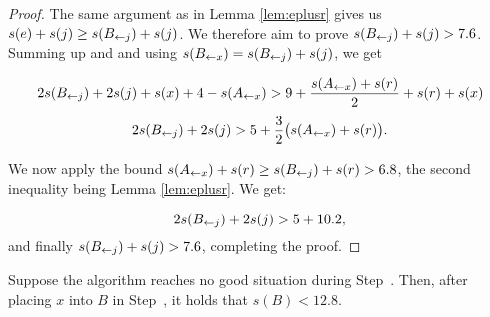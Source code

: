 \begin{proof}

The same argument as in Lemma \ref{lem:eplusr} gives us $s(e) + s(j) \ge  s(B_{\leftarrow j}) + s(j)$.
We therefore aim to prove $s(B_{\leftarrow j}) + s(j) > 7.6$. Summing up 
and  and using $s(B_{\leftarrow x}) = s(B_{\leftarrow j}) + s(j)$, we get

\[ 2s(B_{\leftarrow j}) + 2s(j) + s(x) + 4 - s(A_{\leftarrow x}) > 9 + \frac{s(A_{\leftarrow x}) + s(r)}{2} + s(r) + s(x)\]
\[ 2s(B_{\leftarrow j}) + 2s(j) > 5 + \frac32 \big(s(A_{\leftarrow x})  + s(r)\big).\]

We now apply the bound $s(A_{\leftarrow x}) + s(r) \ge  s(B_{\leftarrow j}) + s(r) > 6.8$, the second inequality being Lemma \ref{lem:eplusr}. We get:

\[ 2s(B_{\leftarrow j})+ 2s(j) > 5+ 10.2, \]
and finally $s(B_{\leftarrow j}) + s(j) > 7.6$, completing the proof.

\end{proof}

%
%
%

\begin{lem}
Suppose the algorithm \tbalg reaches no good situation during Step~{\rm {}}.
Then, after placing $x$ into $B$ in Step~{\rm {}}, it holds that $s(B) < 12.8$.
\end{lem}

